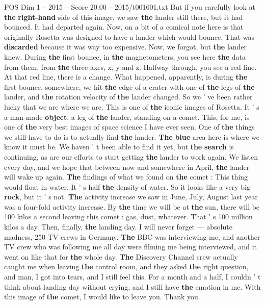 \begin{textsample}{POS Dim 1 – 2015 – Score 20.00 – 2015/t001601.txt}
But if you carefully look at \textbf{the} \textbf{right-hand} side of this image, we saw \textbf{the} lander still there, but it had bounced.
It had departed again.
Now, on a bit of a comical note here is that originally Rosetta was designed to have a lander which would bounce.
That was \textbf{discarded} because it was way too expensive.
Now, we forgot, but \textbf{the} lander knew.
During \textbf{the} first bounce, in \textbf{the} magnetometers, you see here \textbf{the} data from them, from \textbf{the} three axes, x, y and z.
Halfway through, you see a red line.
At that red line, there is a change.
What happened, apparently, is during \textbf{the} first bounce, somewhere, we hit \textbf{the} edge of a crater with one of \textbf{the} legs of \textbf{the} lander, and \textbf{the} rotation velocity of \textbf{the} lander changed.
So we ' ve been rather lucky that we are where we are.
This is one of \textbf{the} iconic images of Rosetta.
It ' s a man-made \textbf{object}, a leg of \textbf{the} lander, standing on a comet.
This, for me, is one of \textbf{the} very best images of space science I have ever seen.
One of \textbf{the} things we still have to do is to actually find \textbf{the} lander. \textbf{The} \textbf{blue} area here is where we know it must be.
We haven ' t been able to find it yet, but \textbf{the} \textbf{search} is continuing, as are our efforts to start getting \textbf{the} lander to work again.
We listen every day, and we hope that between now and somewhere in April, \textbf{the} lander will wake up again. \textbf{The} findings of what we found on \textbf{the} comet : This thing would float in water.
It ' s half \textbf{the} density of water.
So it looks like a very big \textbf{rock}, but it ' s not. \textbf{The} activity increase we saw in June, July, August last year was a four-fold activity increase.
By \textbf{the} time we will be at \textbf{the} sun, there will be 100 kilos a second leaving this comet : gas, dust, whatever.
That ' s 100 million kilos a day.
Then, finally, \textbf{the} landing day.
I will never forget — absolute madness, 250 TV crews in Germany. \textbf{The} BBC was interviewing me, and another TV crew who was following me all day were filming me being interviewed, and it went on like that for \textbf{the} whole day. \textbf{The} Discovery Channel crew actually caught me when leaving \textbf{the} control room, and they asked \textbf{the} right question, and man, I got into tears, and I still feel this.
For a month and a half, I couldn ' t think about landing day without crying, and I still have \textbf{the} emotion in me.
With this image of \textbf{the} comet, I would like to leave you.
Thank you.

\end{textsample}
